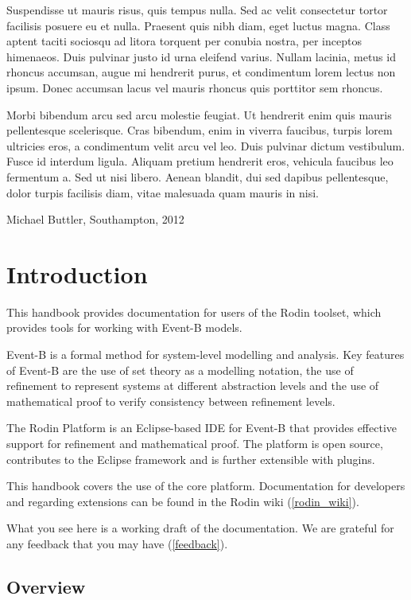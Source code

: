 \documentclass[12pt]{book}
\begin{document}
Suspendisse ut mauris risus, quis tempus nulla. Sed ac velit consectetur tortor facilisis posuere eu et nulla. Praesent quis nibh diam, eget luctus magna. Class aptent taciti sociosqu ad litora torquent per conubia nostra, per inceptos himenaeos. Duis pulvinar justo id urna eleifend varius. Nullam lacinia, metus id rhoncus accumsan, augue mi hendrerit purus, et condimentum lorem lectus non ipsum. Donec accumsan lacus vel mauris rhoncus quis porttitor sem rhoncus. 

Morbi bibendum arcu sed arcu molestie feugiat. Ut hendrerit enim quis mauris pellentesque scelerisque. Cras bibendum, enim in viverra faucibus, turpis lorem ultricies eros, a condimentum velit arcu vel leo. Duis pulvinar dictum vestibulum. Fusce id interdum ligula. Aliquam pretium hendrerit eros, vehicula faucibus leo fermentum a. Sed ut nisi libero. Aenean blandit, dui sed dapibus pellentesque, dolor turpis facilisis diam, vitae malesuada quam mauris in nisi.


\begin{flushright}Michael Buttler, Southampton, 2012\end{flushright}

\chapter{Introduction}

This handbook provides documentation for users of the Rodin toolset, which provides tools for working with Event-B models.

Event-B is a formal method for system-level modelling and analysis. Key features of Event-B are the use of set theory as a modelling notation, the use of refinement to represent systems at different abstraction levels and the use of mathematical proof to verify consistency between refinement levels.

The Rodin Platform is an Eclipse-based IDE for Event-B that provides effective support for refinement and mathematical proof. The platform is open source, contributes to the Eclipse framework and is further extensible with plugins. 

This handbook covers the use of the core platform.  Documentation for developers and regarding extensions can be found in the Rodin wiki (\ref{rodin_wiki}).

What you see here is a working draft of the documentation.  We are grateful for any feedback that you may have (\ref{feedback}).

\section{Overview}
\end{document}
